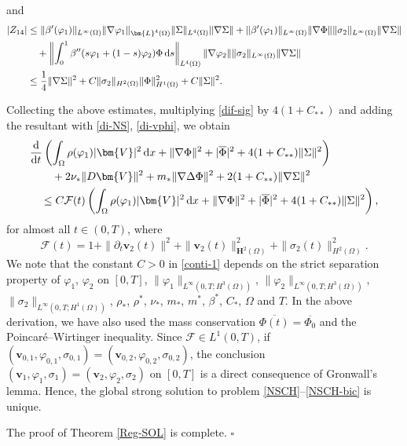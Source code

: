 \documentclass[11pt,reqno]{amsart}
\def\d{{\rm d}}
\def\H{\bm{H}}
\def\L{\bm{L}}
\def\vv{\bm{v}}
\begin{document}
and
%
\begin{align*}
|Z_{14}|&\leq \|\beta'(\varphi_1)\|_{L^\infty(\Omega)}
\|\nabla \varphi_1\|_{\L^4(\Omega)}\|\Sigma\|_{L^4(\Omega)} \|\nabla \Sigma\|
+ \|\beta'(\varphi_1)\|_{L^\infty(\Omega)}\|\nabla \Phi\| \|\sigma_2\|_{L^\infty(\Omega)}
\|\nabla \Sigma\|
\notag\\
&\quad + \left\|\int_0^1\beta''(s\varphi_1+(1-s)\varphi_2)\Phi\,\d s\right\|_{L^4(\Omega)}
\|\nabla \varphi_2\|\|\sigma_2\|_{L^\infty(\Omega)}\|\nabla \Sigma\|
\notag\\
&\leq \frac{1}{4}\|\nabla \Sigma\|^2
+ C \|\sigma_2\|_{H^2(\Omega)} \|\Phi\|_{H^1(\Omega)}^2
 + C\|\Sigma\|^2.
\end{align*}

Collecting the above estimates, multiplying \eqref{dif-sig} by $4(1+C_{**})$ and adding the resultant with \eqref{di-NS}, \eqref{di-vphi}, we obtain
%
\begin{align}
&\frac{\d}{\d t} \left(\int_\Omega \rho(\varphi_1) |\bm{V}|^2\,\d x + \|\nabla \Phi\|^2 + |\overline{\Phi}|^2 + 4(1+C_{**})\|\Sigma\|^2\right)
\notag\\
&\qquad + 2\nu_*\|D \bm{V}\|^2
+  m_* \|\nabla \Delta \Phi\|^2
+ 2(1+C_{**})\|\nabla \Sigma\|^2
\notag\\
&\quad \leq C\mathcal{F}(t)\left(\int_\Omega \rho(\varphi_1) |\bm{V}|^2\,\d x
+ \|\nabla \Phi\|^2
+ |\overline{\Phi}|^2
+ 4(1+C_{**})\|\Sigma\|^2\right),
\label{conti-1}
\end{align}
%
for almost all $t\in (0,T)$, where
$$
\mathcal{F}(t)=1 + \|\partial_t\vv_2(t)\|^2
+ \|\vv_2(t)\|^2_{\H^2(\Omega)} +\|\sigma_2(t)\|_{H^2(\Omega)}^2.
$$
We note that the constant $C>0$ in \eqref{conti-1} depends on the strict separation property of $\varphi_1$, $\varphi_2$ on $[0,T]$, $\|\varphi_1\|_{L^\infty(0,T;H^3(\Omega))}$, $\|\varphi_2\|_{L^\infty(0,T;H^3(\Omega))}$, $\|\sigma_2\|_{L^\infty(0,T;H^1(\Omega))}$, $\rho_*$, $\rho^*$, $\nu_*$, $m_*$, $m^*$, $\beta^*$, $C_*$, $\Omega$ and $T$. In the above derivation, we have also used the mass conservation $\overline{\Phi(t)}= \overline{\Phi_0}$ and the Poincar\'e--Wirtinger inequality. Since $\mathcal{F} \in L^1(0, T)$, if
$(\vv_{0,1}, \varphi_{0,1}, \sigma_{0,1})=(\vv_{0,2}, \varphi_{0,2}, \sigma_{0,2})$, the conclusion $(\vv_1,\varphi_1,\sigma_1)=(\vv_2,\varphi_2,\sigma_2)$ on $[0, T]$ is a direct consequence of Gronwall's lemma. Hence, the global strong solution to problem \eqref{NSCH}--\eqref{NSCH-bic} is unique.

The proof of Theorem \ref{Reg-SOL} is complete.
\hfill $\square$
\end{document}
